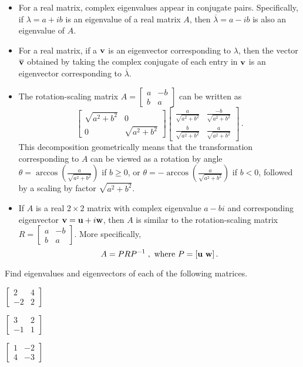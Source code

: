 \begin{itemize}
\item For a real matrix, complex eigenvalues appear in conjugate pairs. Specifically, if $\lambda=a+ib$ is an eigenvalue of a real matrix $A$, then $\overline{\lambda}=a-ib$ is also an eigenvalue of $A$.
\item For a real matrix, if a $\mathbf{v}$ is an eigenvector corresponding to $\lambda$, then the vector $\overline{\mathbf{v}}$ obtained by taking the complex conjugate of each entry in $\mathbf{v}$ is an eigenvector corresponding to $\overline{\lambda}$.
\item The rotation-scaling matrix $A=\left[ \begin{array}{cr} a&-b \\ b&a \end{array} \right]$ can be written as 
\[ \left[ \begin{array}{cc} \sqrt{a^2+b^2} &0 \\ 0&\sqrt{a^2+b^2} \end{array} \right] \left[ \begin{array}{cc} \frac{a}{\sqrt{a^2+b^2}}&\frac{-b}{\sqrt{a^2+b^2}} \\ \frac{b}{\sqrt{a^2+b^2}}&\frac{a}{\sqrt{a^2+b^2}}\end{array} \right] \, .\]
This decomposition geometrically means that the transformation corresponding to $A$ can be viewed as a rotation by angle $\theta=\arccos\left(\frac{a}{\sqrt{a^2+b^2}}\right)$ if $b\geq 0$, or $\theta=-\arccos\left(\frac{a}{\sqrt{a^2+b^2}}\right)$ if $b<0$, followed by a scaling by factor $\sqrt{a^2+b^2}$. 
\item If $A$ is a real $2\times 2$ matrix with complex eigenvalue $a-bi$ and corresponding eigenvector $\mathbf{v}=\mathbf{u}+i\mathbf{w}$, then $A$ is similar to the rotation-scaling matrix $R=\left[ \begin{array}{cr} a&-b \\ b&a \end{array} \right]$. More specifically,
\[ A=PRP^{-1} \; , \text{ where } P=[ \mathbf{u} \ \mathbf{w} ]\, .\]
\end{itemize}


\be
\item Find eigenvalues and eigenvectors of each of the following matrices.
\ba \item $\left[ \begin{array}{rc} 2&4 \\ -2&2 \end{array} \right]$
\item $\left[ \begin{array}{rc} 3&2 \\ -1&1 \end{array} \right]$
\item $\left[ \begin{array}{cr} 1&-2 \\ 4&-3 \end{array} \right]$
\ea

